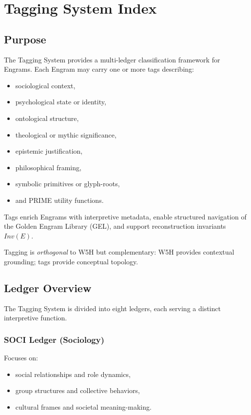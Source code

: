 \chapter{Tagging System Index}
\label{chap:Tagging_Index}

\section{Purpose}

The Tagging System provides a multi-ledger classification framework for Engrams.
Each Engram may carry one or more tags describing:
\begin{itemize}
    \item sociological context,
    \item psychological state or identity,
    \item ontological structure,
    \item theological or mythic significance,
    \item epistemic justification,
    \item philosophical framing,
    \item symbolic primitives or glyph-roots,
    \item and PRIME utility functions.
\end{itemize}

Tags enrich Engrams with interpretive metadata, enable structured navigation of
the Golden Engram Library (GEL), and support reconstruction invariants $Inv(E)$.

Tagging is \emph{orthogonal} to W5H but complementary:
W5H provides contextual grounding;  
tags provide conceptual topology.

\section{Ledger Overview}

The Tagging System is divided into eight ledgers, each serving a distinct
interpretive function.

\subsection{SOCI Ledger (Sociology)}
Focuses on:
\begin{itemize}
    \item social relationships and role dynamics,
    \item group structures and collective behaviors,
    \item cultural frames and societal meaning-making.
\end{itemize}


